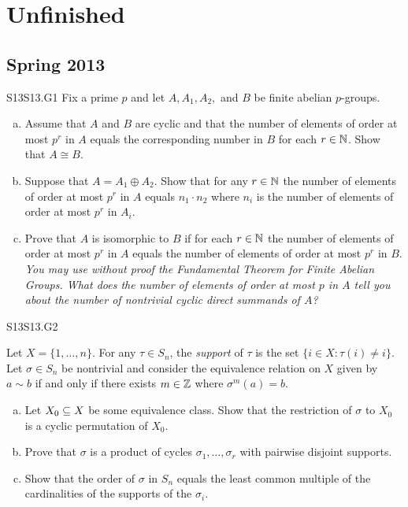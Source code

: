 \documentclass[../AlgebraQualSolutions.tex]{subfiles}
\begin{document}
\section{Unfinished}


\subsection{Spring 2013}

\begin{prob}{S13}{S13.G1}
	Fix a prime $p$ and let $A, A_1, A_2,$ and $B$ be finite abelian $p$-groups.

	\begin{enumerate}[(a)]
		\item Assume that $A$ and $B$ are cyclic and that the number of elements of order at most $p^r$ in $A$ equals the corresponding number in $B$ for each $r \in \mathbb{N}$. Show that $A \cong B$.
		\item Suppose that $A = A_1 \oplus A_2$. Show that for any $r \in \mathbb{N}$ the number of elements of order at most $p^r$ in $A$ equals $n_1\cdot n_2$ where $n_i$ is the number of elements of order at most $p^r$ in $A_i$.
		\item Prove that $A$ is isomorphic to $B$ if for each $r\in \mathbb{N}$ the number of elements of order at most $p^r$ in $A$ equals the number of elements of order at most $p^r$ in $B$. \emph{You may use without proof the Fundamental Theorem for Finite Abelian Groups. What does the number of elements of order at most $p$ in $A$ tell you about the number of nontrivial cyclic direct summands of $A$?}
	\end{enumerate}
\end{prob}

\begin{prob}{S13}{S13.G2}

	Let  $X = \{1,\ldots, n\}$. For any $\tau \in S_n$, the \emph{support} of $\tau$ is the set $\{i \in X: \tau(i) \neq i\}$. Let $\sigma \in S_n$ be nontrivial and consider the equivalence relation on $X$ given by $a \sim b$ if and only if there exists $m \in \mathbb{Z}$ where $\sigma^m(a) = b$.

	\begin{enumerate}[(a)]
		\item Let $X_0 \subseteq X$ be some equivalence class. Show that the restriction of $\sigma$ to $X_0$ is a cyclic permutation of $X_0$.
		\item Prove that $\sigma$ is a product of cycles $\sigma_1,\ldots,\sigma_r$ with pairwise disjoint supports.
		\item Show that the order of $\sigma$ in $S_n$ equals the least common multiple of the cardinalities of the supports of the $\sigma_i$.
	\end{enumerate}
\end{prob}
\end{document}
